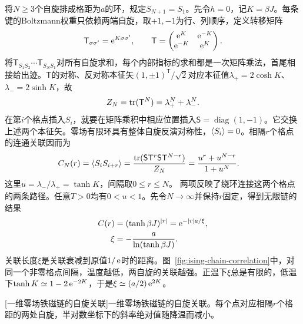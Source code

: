 将$N \geqslant 3$个自旋排成格距为$a$的环，规定$S_{N+1} = S_1$。先令$h = 0$，记$K = \beta J$。每条键的Boltzmann权重只依赖两端自旋，取$+1,-1$为行、列顺序，定义转移矩阵
\begin{equation}
	\label{eq:sm-ising-transfer-matrix}
	\mathsf T_{\sigma\sigma'} = \mathop{}\!\mathrm{e}^{K\sigma\sigma'},\qquad
	\mathsf T = \begin{pmatrix}\mathop{}\!\mathrm{e}^K&\mathop{}\!\mathrm{e}^{-K}\\\mathop{}\!\mathrm{e}^{-K}&\mathop{}\!\mathrm{e}^K\end{pmatrix}.
\end{equation}
将$\mathsf T_{S_1 S_2}\cdots\mathsf T_{S_N S_1}$对所有自旋求和，每个内部指标的求和都是一次矩阵乘法，首尾相接给出迹。$\mathsf T$的对称、反对称本征矢$(1,\pm1)^{\mathsf T}/\sqrt2$对应本征值$\lambda_+ = 2\cosh K$、$\lambda_- = 2\sinh K$，故
\begin{equation}
	\label{eq:sm-ising-ring-partition}
	Z_N = \operatorname{tr}(\mathsf T^N) = \lambda_+^N + \lambda_-^N .
\end{equation}
在第$i$个格点插入$S_i$，就要在矩阵乘积中相应位置插入$\mathsf S = \operatorname{diag}(1,-1)$。它交换上述两个本征矢。零场有限环具有整体自旋反演对称性，$\langle S_i\rangle = 0$。相隔$r$个格点的连通关联因而为
\begin{align}
	C_N(r) &= \langle S_iS_{i+r}\rangle
	= \frac{\operatorname{tr}(\mathsf S\mathsf T^r\mathsf S\mathsf T^{N-r})}{Z_N}
	= \frac{u^r + u^{N-r}}{1 + u^N}.
	\label{eq:ising-ring-correlation}
\end{align}
这里$u = \lambda_-/\lambda_+ = \tanh K$，间隔取$0 \leqslant r \leqslant N$。
两项反映了绕环连接这两个格点的两条路径。任意$T > 0$均有$0 < u < 1$。先令$N \to \infty$并保持$r$固定，得到无限链的结果
\begin{subequations}\label{eq:ising-chain-xi}
	\begin{align}
		C(r) &= (\tanh\beta J)^{|r|} = \mathop{}\!\mathrm{e}^{-|r|a/\xi},\\
		\xi &= -\frac{a}{\ln(\tanh\beta J)} .
	\end{align}
\end{subequations}
关联长度$\xi$是关联衰减到原值$1/\mathop{}\!\mathrm{e}$时的距离。图~\ref{fig:ising-chain-correlation}中，对同一个非零格点间隔，温度越低，两自旋的关联越强。正温下$\xi$总是有限的，低温下$\tanh K \simeq 1 - 2\mathop{}\!\mathrm{e}^{-2K}$，于是$\xi \simeq (a/2)\mathop{}\!\mathrm{e}^{2K}$。
\begin{notecaptionblock}
	[一维零场铁磁链的自旋关联]{一维零场铁磁链的自旋关联。每个点对应相隔$r$个格距的两处自旋，半对数坐标下的斜率绝对值随降温而减小。}
	\label{fig:ising-chain-correlation}
\end{notecaptionblock}

